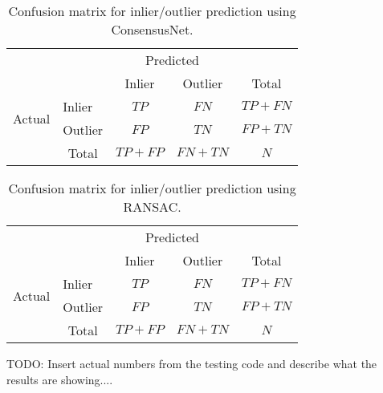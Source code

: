 \begin{table}[H]
\centering
\begin{tabular}{l|l|c|c|c}
	\multicolumn{2}{c}{}&\multicolumn{2}{c}{Predicted}&\\
	\cline{3-4}
	\multicolumn{2}{c|}{}&Inlier&Outlier&\multicolumn{1}{c}{Total}\\
	\cline{2-4}
	\multirow{2}{*}{Actual}& Inlier & $TP$ & $FN$ & $TP+FN$\\
	\cline{2-4}
	& Outlier & $FP$ & $TN$ & $FP+TN$\\
	\cline{2-4}
	\multicolumn{1}{c}{} & \multicolumn{1}{c}{Total} & \multicolumn{1}{c}{$TP+FP$} & \multicolumn{    1}{c}{$FN+TN$} & \multicolumn{1}{c}{$N$}\\
\end{tabular}
	\caption{Confusion matrix for inlier/outlier prediction using ConsensusNet.}
	\label{table:consensusconfusion}
\end{table}


\begin{table}[H]
	\centering
	\begin{tabular}{l|l|c|c|c}
		\multicolumn{2}{c}{}&\multicolumn{2}{c}{Predicted}&\\
		\cline{3-4}
		\multicolumn{2}{c|}{}&Inlier&Outlier&\multicolumn{1}{c}{Total}\\
		\cline{2-4}
		\multirow{2}{*}{Actual}& Inlier & $TP$ & $FN$ & $TP+FN$\\
		\cline{2-4}
		& Outlier & $FP$ & $TN$ & $FP+TN$\\
		\cline{2-4}
		\multicolumn{1}{c}{} & \multicolumn{1}{c}{Total} & \multicolumn{1}{c}{$TP+FP$} & \multicolumn{    1}{c}{$FN+TN$} & \multicolumn{1}{c}{$N$}\\
	\end{tabular}
	\caption{Confusion matrix for inlier/outlier prediction using RANSAC.}
	\label{table:consensusconfusion}
\end{table}

TODO: Insert actual numbers from the testing code and describe what the results are showing....